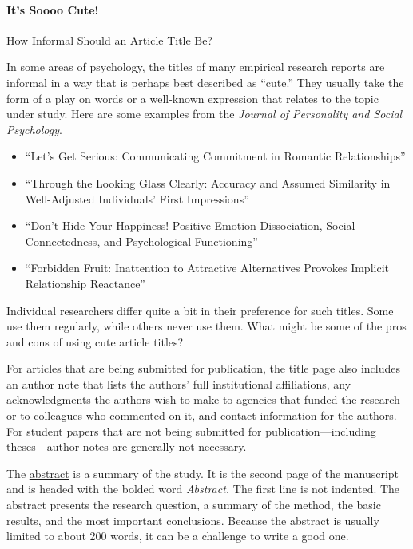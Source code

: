\documentclass[
]{krantz}
\providecommand{\tightlist}{%
  \setlength{\itemsep}{0pt}\setlength{\parskip}{0pt}}
\begin{document}
\paragraph*{It's Soooo Cute!}\label{its-soooo-cute}

How Informal Should an Article Title Be?

In some areas of psychology, the titles of many empirical research reports are informal in a way that is perhaps best described as ``cute.'' They usually take the form of a play on words or a well-known expression that relates to the topic under study. Here are some examples from the \emph{Journal of Personality and Social Psychology}.

\begin{itemize}
\tightlist
\item
  ``Let's Get Serious: Communicating Commitment in Romantic Relationships''
\item
  ``Through the Looking Glass Clearly: Accuracy and Assumed Similarity in Well-Adjusted Individuals' First Impressions''
\item
  ``Don't Hide Your Happiness! Positive Emotion Dissociation, Social Connectedness, and Psychological Functioning''
\item
  ``Forbidden Fruit: Inattention to Attractive Alternatives Provokes Implicit Relationship Reactance''
\end{itemize}

Individual researchers differ quite a bit in their preference for such titles. Some use them regularly, while others never use them. What might be some of the pros and cons of using cute article titles?

For articles that are being submitted for publication, the title page also includes an author note that lists the authors' full institutional affiliations, any acknowledgments the authors wish to make to agencies that funded the research or to colleagues who commented on it, and contact information for the authors. For student papers that are not being submitted for publication---including theses---author notes are generally not necessary.

The \hyperref[abstract]{abstract} is a summary of the study. It is the second page of the manuscript and is headed with the bolded word \emph{Abstract.} The first line is not indented. The abstract presents the research question, a summary of the method, the basic results, and the most important conclusions. Because the abstract is usually limited to about 200 words, it can be a challenge to write a good one.
\end{document}
